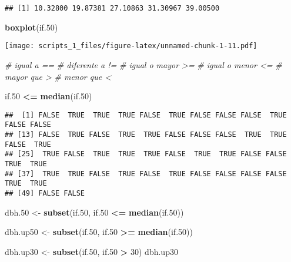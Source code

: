 \documentclass[
]{article}
\newenvironment{Shaded}{\begin{snugshade}}{\end{snugshade}}
\newcommand{\CommentTok}[1]{\textcolor[rgb]{0.56,0.35,0.01}{\textit{#1}}}
\newcommand{\DecValTok}[1]{\textcolor[rgb]{0.00,0.00,0.81}{#1}}
\newcommand{\FloatTok}[1]{\textcolor[rgb]{0.00,0.00,0.81}{#1}}
\newcommand{\KeywordTok}[1]{\textcolor[rgb]{0.13,0.29,0.53}{\textbf{#1}}}
\newcommand{\NormalTok}[1]{#1}
\newcommand{\OperatorTok}[1]{\textcolor[rgb]{0.81,0.36,0.00}{\textbf{#1}}}
\newcommand{\StringTok}[1]{\textcolor[rgb]{0.31,0.60,0.02}{#1}}
\begin{document}
\begin{verbatim}
## [1] 10.32800 19.87381 27.10863 31.30967 39.00500
\end{verbatim}

\begin{Shaded}
\begin{Highlighting}[]
\KeywordTok{boxplot}\NormalTok{(if}\FloatTok{.50}\NormalTok{)}
\end{Highlighting}
\end{Shaded}

\texttt{[image: scripts\_1\_files/figure-latex/unnamed-chunk-1-11.pdf]}

\begin{Shaded}
\begin{Highlighting}[]
\CommentTok{# igual a ==}
\CommentTok{# diferente a !=}
\CommentTok{# igual o mayor >=}
\CommentTok{# igual o menor <=}
\CommentTok{# mayor que >}
\CommentTok{# menor que <}

\NormalTok{if}\FloatTok{.50} \OperatorTok{<=}\StringTok{ }\KeywordTok{median}\NormalTok{(if}\FloatTok{.50}\NormalTok{)}
\end{Highlighting}
\end{Shaded}

\begin{verbatim}
##  [1] FALSE  TRUE  TRUE  TRUE FALSE  TRUE FALSE FALSE FALSE  TRUE FALSE FALSE
## [13] FALSE  TRUE FALSE  TRUE  TRUE FALSE FALSE FALSE  TRUE  TRUE FALSE  TRUE
## [25]  TRUE FALSE  TRUE  TRUE  TRUE FALSE  TRUE  TRUE FALSE FALSE  TRUE  TRUE
## [37]  TRUE  TRUE FALSE  TRUE FALSE  TRUE FALSE FALSE FALSE FALSE  TRUE  TRUE
## [49] FALSE FALSE
\end{verbatim}

\begin{Shaded}
\begin{Highlighting}[]
\NormalTok{dbh}\FloatTok{.50}\NormalTok{ <-}\StringTok{ }\KeywordTok{subset}\NormalTok{(if}\FloatTok{.50}\NormalTok{, if}\FloatTok{.50} \OperatorTok{<=}\StringTok{ }\KeywordTok{median}\NormalTok{(if}\FloatTok{.50}\NormalTok{))}


\NormalTok{dbh.up50 <-}\StringTok{ }\KeywordTok{subset}\NormalTok{(if}\FloatTok{.50}\NormalTok{, if}\FloatTok{.50} \OperatorTok{>=}\StringTok{ }\KeywordTok{median}\NormalTok{(if}\FloatTok{.50}\NormalTok{))}

\NormalTok{dbh.up30 <-}\StringTok{ }\KeywordTok{subset}\NormalTok{(if}\FloatTok{.50}\NormalTok{, if}\FloatTok{.50} \OperatorTok{>}\StringTok{ }\DecValTok{30}\NormalTok{)}
\NormalTok{dbh.up30}
\end{Highlighting}
\end{Shaded}
\end{document}

